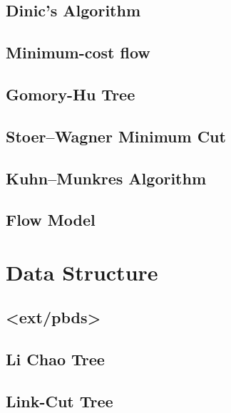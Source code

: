 \documentclass[a4paper,10pt,twocolumn,oneside]{article}
\begin{document}
\subsection{Dinic's Algorithm}

% 
\subsection{Minimum-cost flow}

\subsection{Gomory-Hu Tree}

\subsection{Stoer–Wagner Minimum Cut}

\subsection{Kuhn–Munkres Algorithm}

\subsection{Flow Model}

\section{Data Structure}
% 
\subsection{<ext/pbds>}

\subsection{Li Chao Tree}

\subsection{Link-Cut Tree}

\end{document}
